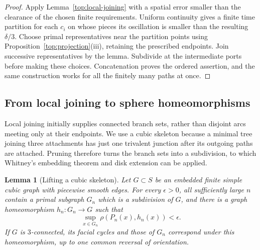 \documentclass[11pt]{article}
\numberwithin{equation}{section}
\newtheorem{lemma}[theorem]{Lemma}
\theoremstyle{definition}
\theoremstyle{remark}
\newcommand{\1}{\mathbf 1}
\begin{document}
\begin{proof}
Apply Lemma~\ref{top:local-joining} with a spatial error smaller than
the clearance of the chosen finite requirements.  Uniform continuity
gives a finite time partition for each $c_i$ on whose pieces its
oscillation is smaller than the resulting $\delta/3$.  Choose primal
representatives near the partition points using
Proposition~\ref{top:projection}(iii), retaining the prescribed endpoints.
Join successive representatives by the lemma.  Subdivide at the
intermediate ports before making these choices.  Concatenation proves
the ordered assertion, and the same construction works for all the
finitely many paths at once.
\end{proof}

\subsection{From local joining to sphere homeomorphisms}

Local joining initially supplies connected branch sets, rather than
disjoint arcs meeting only at their endpoints.  We use a cubic
skeleton because a minimal tree joining three attachments has just
one trivalent junction after its outgoing paths are attached.
Pruning therefore turns the branch sets into a subdivision, to which
Whitney's embedding theorem and disk extension can be applied.

\begin{lemma}[Lifting a cubic skeleton]\label{top:skeleton-lift}
Let $G\subset S$ be an embedded finite simple cubic graph with
piecewise smooth edges.  For every $\epsilon>0$, all sufficiently large
$n$ contain a primal subgraph $G_n$ which is a subdivision of $G$, and
there is a graph homeomorphism $h_n:G_n\to G$ such that
\[
 \sup_{x\in G_n}\rho(P_n(x),h_n(x))<\epsilon.
\]
If $G$ is $3$-connected, its facial cycles and those of $G_n$ correspond
under this homeomorphism, up to one common reversal of orientation.
\end{lemma}
\end{document}
